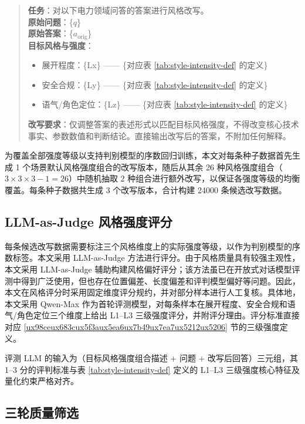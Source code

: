 \documentclass[fontset=fandol,type=master,campus=shenzhen,etitleauto=true]{hithesisbook}
\begin{document}
\begin{quote}
\small
\textbf{任务}：对以下电力领域问答的答案进行风格改写。\\
\textbf{原始问题}：\{$q$\}\\
\textbf{原始答案}：\{$a_{\text{orig}}$\}\\
\textbf{目标风格与强度}：
\begin{itemize}
\item 展开程度：\{Lx\} —— \{对应表 \ref{tab:style-intensity-def} 的定义\}
\item 安全合规：\{Ly\} —— \{对应表 \ref{tab:style-intensity-def} 的定义\}
\item 语气/角色定位：\{Lz\} —— \{对应表 \ref{tab:style-intensity-def} 的定义\}
\end{itemize}
\textbf{改写要求}：仅调整答案的表述形式以匹配目标风格强度，不得改变核心技术事实、参数数值和判断结论。直接输出改写后的答案，不附加任何解释。
\end{quote}

为覆盖全部强度等级以支持判别模型的序数回归训练，本文对每条种子数据首先生成 1 个场景默认风格强度组合的改写版本，随后从其余 26 种风格强度组合（$3 \times 3 \times 3 - 1 = 26$）中随机抽取 2 种组合进行额外改写，以保证各强度等级的均衡覆盖。每条种子数据共生成 3 个改写版本，合计构建 24000 条候选改写数据。

\subsection{LLM-as-Judge 风格强度评分}\label{llm-as-judge-ux4e09ux7ef4ux98ceux683cux8bc4ux5206}

每条候选改写数据需要标注三个风格维度上的实际强度等级，以作为判别模型的序数标签。本文采用 LLM-as-Judge 方法进行评分。由于风格质量具有较强主观性，本文采用 LLM-as-Judge 辅助构建风格偏好评分；该方法虽已在开放式对话模型评测中得到广泛使用，但也存在位置偏差、长度偏差和评判模型偏好等问题\cite{ref65}。因此，本文在风格评分时采用固定维度评分规约，并对部分样本进行人工复核。具体地，本文采用 Qwen-Max 作为首轮评测模型，对每条样本在展开程度、安全合规和语气/角色定位三个维度上给出 L1--L3 三级强度评分，并附评分理由。评分标准直接对应 \ref{ux98ceux683cux5f3aux5ea6ux7b49ux7ea7ux5212ux5206} 节的三级强度定义。

评测 LLM 的输入为（目标风格强度组合描述 + 问题 + 改写后回答）三元组，其 1--3 分的评判标准与表 \ref{tab:style-intensity-def} 定义的 L1--L3 三级强度核心特征及量化约束严格对齐。

\subsection{三轮质量筛选}\label{ux4e09ux8f6eux8d28ux91cfux7b5bux9009}
\end{document}
